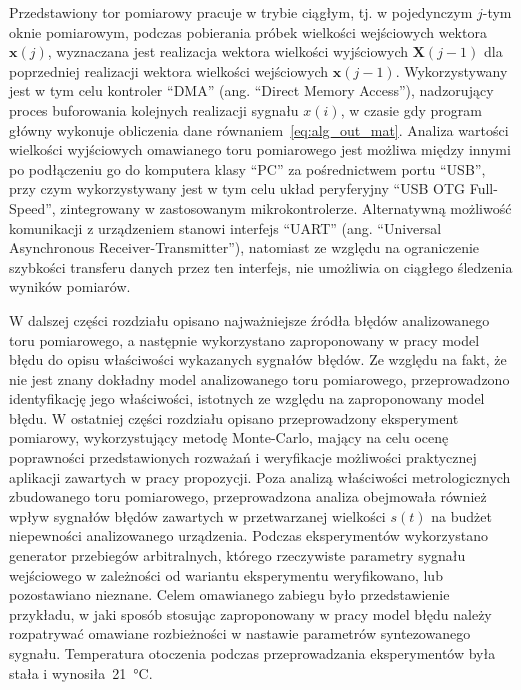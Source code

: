 Przedstawiony tor pomiarowy pracuje w trybie ciągłym, tj. w pojedynczym $j$-tym oknie pomiarowym, podczas pobierania próbek wielkości wejściowych wektora $\mathbf{x}(j)$, wyznaczana jest realizacja wektora wielkości wyjściowych $\mathbf{X}(j-1)$ dla poprzedniej realizacji wektora wielkości wejściowych $\mathbf{x}(j-1)$. Wykorzystywany jest w tym celu kontroler \enquote{DMA} (ang. \enquote{Direct Memory Access}), nadzorujący proces buforowania kolejnych realizacji sygnału $x(i)$, w czasie gdy program główny wykonuje obliczenia dane równaniem~\eqref{eq:alg_out_mat}. Analiza wartości wielkości wyjściowych omawianego toru pomiarowego jest możliwa między innymi po podłączeniu go do komputera klasy \enquote{PC} za pośrednictwem portu \enquote{USB}, przy czym wykorzystywany jest w tym celu układ peryferyjny \enquote{USB OTG Full-Speed}, zintegrowany w zastosowanym mikrokontrolerze. Alternatywną możliwość komunikacji z urządzeniem stanowi interfejs \enquote{UART} (ang. \enquote{Universal Asynchronous Receiver-Transmitter}), natomiast ze względu na ograniczenie szybkości transferu danych przez ten interfejs, nie umożliwia on ciągłego śledzenia wyników pomiarów.

W dalszej części rozdziału opisano najważniejsze źródła błędów analizowanego toru pomiarowego, a następnie wykorzystano zaproponowany w pracy model błędu do opisu właściwości wykazanych sygnałów błędów. Ze względu na fakt, że nie jest znany dokładny model analizowanego toru pomiarowego, przeprowadzono identyfikację jego właściwości, istotnych ze względu na zaproponowany model błędu. W ostatniej części rozdziału opisano przeprowadzony eksperyment pomiarowy, wykorzystujący metodę Monte-Carlo, mający na celu ocenę poprawności przedstawionych rozważań i weryfikacje możliwości praktycznej aplikacji zawartych w pracy propozycji. Poza analizą właściwości metrologicznych zbudowanego toru pomiarowego, przeprowadzona analiza obejmowała również wpływ sygnałów błędów zawartych w przetwarzanej wielkości $s(t)$ na budżet niepewności analizowanego urządzenia. Podczas eksperymentów wykorzystano generator przebiegów arbitralnych, którego rzeczywiste parametry sygnału wejściowego w zależności od wariantu eksperymentu weryfikowano, lub pozostawiano nieznane. Celem omawianego zabiegu było przedstawienie przykładu, w jaki sposób stosując zaproponowany w pracy model błędu należy rozpatrywać omawiane rozbieżności w nastawie parametrów syntezowanego sygnału. Temperatura otoczenia podczas przeprowadzania eksperymentów była stała i wynosiła~\qty{21}{\degreeCelsius}.

